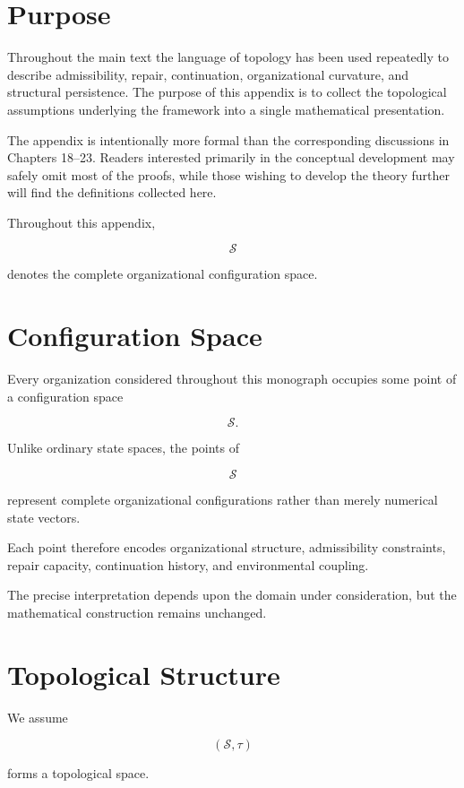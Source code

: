 \documentclass[11pt,oneside]{book}
\numberwithin{equation}{chapter}
\theoremstyle{definition}
\theoremstyle{plain}
\begin{document}
\section{Purpose}

Throughout the main text the language of topology has been used repeatedly
to describe admissibility, repair, continuation, organizational curvature,
and structural persistence. The purpose of this appendix is to collect the
topological assumptions underlying the framework into a single mathematical
presentation.

The appendix is intentionally more formal than the corresponding
discussions in Chapters 18--23. Readers interested primarily in the
conceptual development may safely omit most of the proofs, while those
wishing to develop the theory further will find the definitions collected
here.

Throughout this appendix,

\[
\mathcal S
\]

denotes the complete organizational configuration space.

\section{Configuration Space}

Every organization considered throughout this monograph occupies some point
of a configuration space

\[
\mathcal S.
\]

Unlike ordinary state spaces, the points of

\[
\mathcal S
\]

represent complete organizational configurations rather than merely
numerical state vectors.

Each point therefore encodes organizational structure, admissibility
constraints, repair capacity, continuation history, and environmental
coupling.

The precise interpretation depends upon the domain under consideration, but
the mathematical construction remains unchanged.

\section{Topological Structure}

We assume

\[
(\mathcal S,\tau)
\]

forms a topological space.
\end{document}
